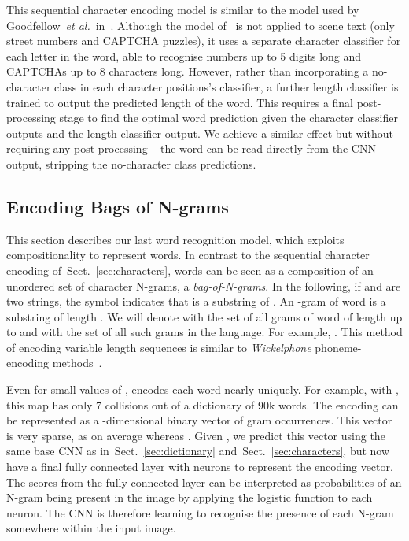 \documentclass{article} \usepackage{nips14submit_e,times}
\newcommand{\sref}[1]{Sect.~\ref{#1}}
\def\etal{\emph{et al.}}
\renewcommand{\paragraph}[1]{\par\noindent{\bf #1}}
\begin{document}
\paragraph{Discussion.}
This sequential character encoding model is similar to the model used by Goodfellow~\etal~in~\cite{Goodfellow13}. Although the model of~\cite{Goodfellow13} is not applied to scene text (only street numbers and CAPTCHA puzzles), it uses a separate character classifier for each letter in the word, able to recognise numbers up to 5 digits long and CAPTCHAs up to 8 characters long. However, rather than incorporating a no-character class in each character positions's classifier, a further length classifier is trained to output the predicted length of the word. This requires a final post-processing stage to find the optimal word prediction given the character classifier outputs and the length classifier output. We achieve a similar effect but without requiring any post processing -- the word can be read directly from the CNN output, stripping the no-character class predictions.

\subsection{Encoding Bags of N-grams}\label{sec:ngrams}
This section describes our last word recognition model, which exploits
compositionality to represent words. In contrast to the sequential
character encoding of~\sref{sec:characters}, words can be seen as a
composition of an unordered set of character N-grams, a
\emph{bag-of-N-grams}. In the following, if  and
 are two strings, the symbol  indicates
that  is a substring
of . An -gram
of word  is a substring  of length . We will
denote with  the set
of all grams of word  of length up to  and with  the set of all such grams in the
language. For example,
. This method of encoding variable length sequences is similar to \emph{Wickelphone} phoneme-encoding methods~\cite{Wickelgran69}.

Even for small values of ,  encodes each word  nearly uniquely. For example, with , this map has only 7 collisions out of a dictionary of 90k words. The encoding  can be represented as a -dimensional binary vector of gram occurrences. This vector is very sparse, as on average  whereas . Given , we predict this vector using the same base CNN as in~\sref{sec:dictionary} and~\sref{sec:characters}, but now have a final fully connected layer with  neurons to represent the encoding vector. The scores from the fully connected layer can be interpreted as probabilities of an N-gram being present in the image by applying the logistic function to each neuron. The CNN is therefore learning to recognise the presence of each N-gram somewhere within the input image.
\end{document}
